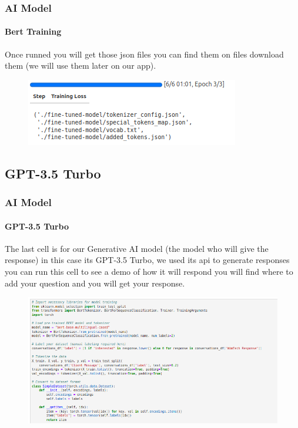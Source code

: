 \documentclass[
	11pt, %
]{beamer}
\begin{document}
\begin{frame}
	\frametitle{AI Model}
	\framesubtitle{Bert Training}
	
	Once runned you will get those json files you can find them on files download them (we will use them later on our app).

	\begin{figure}
		\includegraphics[width=0.8\linewidth]{bert_training_done.png}
	\end{figure}

\end{frame}

\subsection{GPT-3.5 Turbo}

\begin{frame}
	\frametitle{AI Model}
	\framesubtitle{GPT-3.5 Turbo}
	
	The last cell is for our Generative AI model (the model who will give the response) in this case its GPT-3.5 Turbo, we used its api to generate responses you can run this cell to see a demo of how it will respond you will find where to add your question and you will get your response.

	\begin{figure}
		\includegraphics[width=0.8\linewidth]{bert_training.png}
	\end{figure}

\end{frame}

\end{document}
